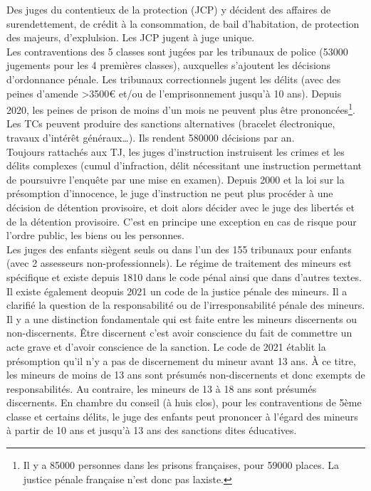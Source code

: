 \documentclass[math]{cours}
\begin{document}
	Des juges du contentieux de la protection (JCP) y décident des affaires de surendettement, de crédit à la consommation, de bail d'habitation, de protection des majeurs, d'explulsion.
	Les JCP jugent à juge unique.\\
	Les contraventions des 5 classes sont jugées par les tribunaux de police (53000 jugements pour les 4 premières classes), auxquelles s'ajoutent les décisions d'ordonnance pénale.
	Les tribunaux correctionnels jugent les délits (avec des peines d'amende >3500€ et/ou de l'emprisonnement jusqu'à 10 ans).
	Depuis 2020, les peines de prison de moins d'un mois ne peuvent plus être prononcées\footnote{Il y a 85000 personnes dans les prisons françaises, pour 59000 places. La justice pénale française n'est donc pas laxiste.}.
	Les TCs peuvent produire des sanctions alternatives (bracelet électronique, travaux d'intérêt généraux\ldots). Ils rendent 580000 décisions par an.\\
	Toujours rattachés aux TJ, les juges d'instruction instruisent les crimes et les délits complexes (cumul d'infraction, délit nécessitant une instruction permettant de poursuivre l'enquête par une mise en examen).
	Depuis 2000 et la loi sur la présomption d'innocence, le juge d'instruction ne peut plus procéder à une décision de détention provisoire, et doit alors décider avec le juge des libertés et de la détention provisoire.
	C'est en principe une exception en cas de risque pour l'ordre public, les biens ou les personnes.\\
	Les juges des enfants siègent seuls ou dans l'un des 155 tribunaux pour enfants (avec 2 assesseurs non-professionnels).
	Le régime de traitement des mineurs est spécifique et existe depuis 1810 dans le code pénal ainsi que dans d'autres textes.
	Il existe également deopuis 2021 un code de la justice pénale des mineurs.
	Il a clarifié la question de la responsabilité ou de l'irresponsabilité pénale des mineurs.
	Il y a une distinction fondamentale qui est faite entre les mineurs discernents ou non-discernents.
	Être discernent c'est avoir conscience du fait de commettre un acte grave et d'avoir conscience de la sanction.
	Le code de 2021 établit la présomption qu'il n'y a pas de discernement du mineur avant 13 ans.
	À ce titre, les mineurs de moins de 13 ans sont présumés non-discernents et donc exempts de responsabilités.
	Au contraire, les mineurs de 13 à 18 ans sont présumés discernents.
	En chambre du conseil (à huis clos), pour les contraventions de 5ème classe et certains délits, le juge des enfants peut prononcer à l'égard des mineurs à partir de 10 ans et jusqu'à 13 ans des sanctions dites éducatives.
\end{document}
